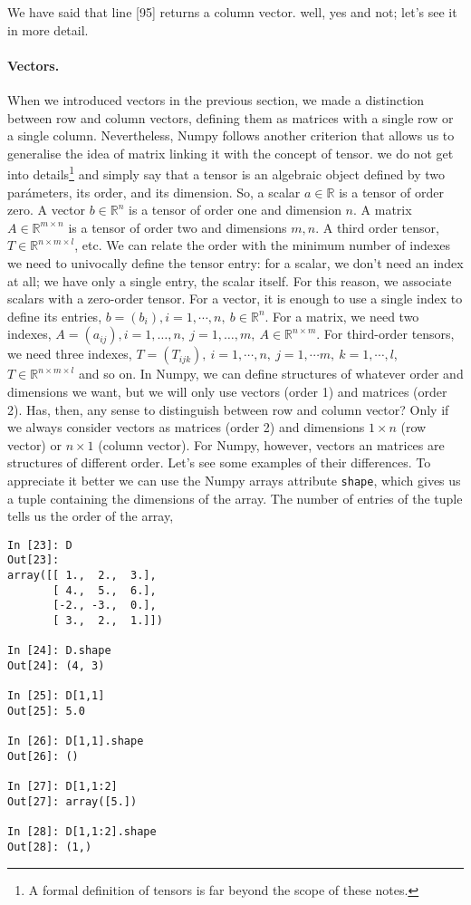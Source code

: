 \begin{paracol}{2}
We have said that line [95] returns a column vector. well, yes and not; let's see it in more detail.

\paragraph{Vectors.} When we introduced vectors in the previous section, we made a distinction between row and column vectors, defining them as matrices with a single row or a single column. Nevertheless, Numpy follows another criterion that allows us to generalise the idea of matrix linking it with the concept of tensor. we do not get into details\footnote{A formal definition of tensors is far beyond the scope of these notes.} and simply say that a tensor is an algebraic object defined by two parámeters, its order, and its dimension. So, a scalar $a \in \mathbb{R}$ is a tensor of order zero. A vector $b \in \mathbb{R}^n$ is a tensor of order one and dimension $n$. A matrix $A\in \mathbb{R}^{m\times n}$ is a tensor of order two and dimensions $m,n$. A third order tensor, $T\in\mathbb{R}^{n\times m\times l}$, etc. We can relate the order with the minimum number of indexes we need to univocally define the tensor entry: for a scalar, we don't need an index at all; we have only a single entry, the scalar itself. For this reason, we associate scalars with a zero-order tensor. For a vector, it is enough to use a single index to define its entries, $b=(b_i), i = 1,\cdots, n,\ b \in \mathbb{R}^n$. For a matrix, we need two indexes, $A = (a_{ij}), i =1,\dots,n,\ j = 1,\dots,m,\ A \in \mathbb{R}^{n\times m}$. For third-order tensors, we need three indexes, $T=(T_{ijk}),\ i =1,\cdots, n,\ j =1,\cdots m,\ k = 1,\cdots, l$, $T\in \mathbb{R}^{n\times m \times l}$ and so on. In Numpy, we can define structures of whatever order and dimensions we want, but we will only use vectors (order 1) and matrices (order 2). Has, then, any sense to distinguish between row and column vector? Only if we always consider vectors as matrices (order 2) and dimensions $1\times n$ (row vector) or $n\times 1$ (column vector). For Numpy, however, vectors an matrices are structures of different order. Let's see some examples of their differences. To appreciate it better we can use the Numpy arrays attribute \texttt{shape}, which gives us a tuple containing the dimensions of the array. The number of entries of the tuple tells us the order of the array,     
\end{paracol}
\begin{center}
    \begin{minipage}{0.3\textwidth}
    \begin{verbatim}
In [23]: D
Out[23]: 
array([[ 1.,  2.,  3.],
       [ 4.,  5.,  6.],
       [-2., -3.,  0.],
       [ 3.,  2.,  1.]])

In [24]: D.shape
Out[24]: (4, 3)

In [25]: D[1,1]
Out[25]: 5.0

In [26]: D[1,1].shape
Out[26]: ()

In [27]: D[1,1:2]
Out[27]: array([5.])

In [28]: D[1,1:2].shape
Out[28]: (1,)
\end{verbatim}
\end{minipage}
\end{center}
